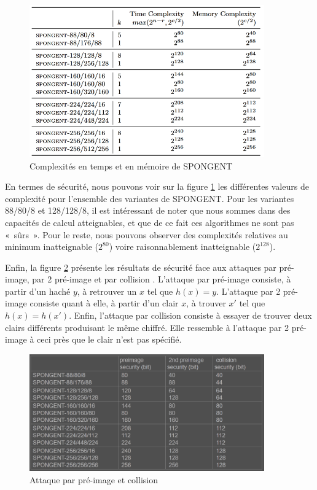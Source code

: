		\begin{figure}[!h]
			\centering
			\includegraphics[width=0.9\textwidth]{imgs/Spongent/timeComplexity.png}
			\caption{Complexités en temps et en mémoire de SPONGENT}
			\label{timeComplexity}
		\end{figure}

			En termes de sécurité, nous pouvons voir sur la figure \ref{timeComplexity}
		les différentes valeurs de complexité pour l'ensemble des variantes de
		SPONGENT. Pour les variantes 88/80/8 et 128/128/8, il est intéressant de
		noter que nous sommes dans des capacités de calcul atteignables, et que de
		ce fait ces algorithmes ne sont pas « sûrs ». Pour le reste, nous pouvons
		observer des complexités relatives au minimum inatteignable ($2^{80}$) voire
		raisonnablement inatteignable ($2^{128}$).

			Enfin, la figure \ref{attaquePreImage} présente les résultats de sécurité
		face aux attaques par pré-image, par 2 pré-image et par collision
		\cite{googleSpongent}. L'attaque par pré-image consiste, à partir d'un haché
		$y$, à retrouver un $x$ tel que $h(x) = y$. L'attaque par 2
		pré-image consiste quant à elle, à partir d'un clair $x$, à trouver $x'$ tel
		que $h(x) = h(x')$. Enfin, l'attaque par collision consiste à essayer de
		trouver deux clairs différents produisant le même chiffré. Elle ressemble à
		l'attaque par 2 pré-image à ceci près que le clair n'est pas
		spécifié.

		\begin{figure}[!h]
			\centering
			\includegraphics[width=0.9\textwidth, height=0.3\textheight]{imgs/Spongent/attaquePreImage.png}
			\caption{Attaque par pré-image et collision}
			\label{attaquePreImage}
		\end{figure}


